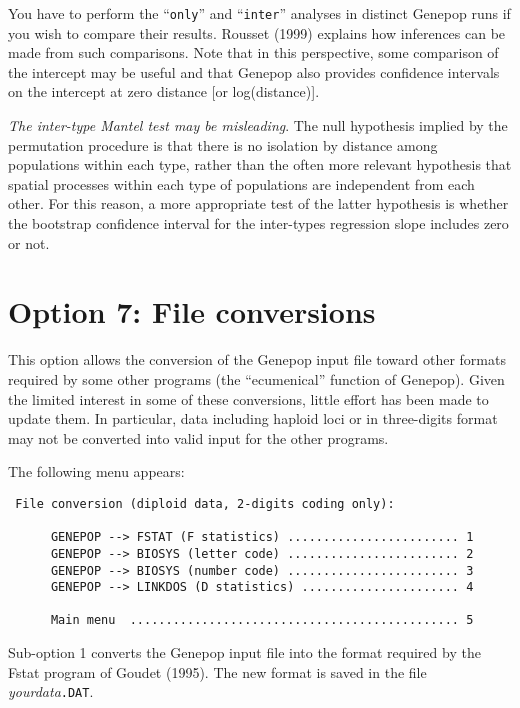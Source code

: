 \documentclass[12pt,]{book}
\theoremstyle{definition}
\theoremstyle{definition}
\theoremstyle{definition}
\theoremstyle{remark}
\begin{document}
You have to perform the ``\texttt{only}'' and ``\texttt{inter}''
analyses in distinct Genepop runs if you wish to compare their results.
Rousset (1999) explains how inferences can be made from such
comparisons. Note that in this perspective, some comparison of the
intercept may be useful and that Genepop also provides confidence
intervals on the intercept at zero distance {[}or log(distance){]}.

\emph{The inter-type Mantel test may be
misleading}. The null hypothesis implied by
the permutation procedure is that there is no isolation by distance
among populations within each type, rather than the often more relevant
hypothesis that spatial processes within each type of populations are
independent from each other. For this reason, a more appropriate test of
the latter hypothesis is whether the bootstrap confidence interval for
the inter-types regression slope includes zero or not.

\section{Option 7: File conversions}\label{option-7-file-conversions}

This option allows the conversion of the Genepop input file toward other
formats required by some other programs (the ``ecumenical'' function of
Genepop). Given the limited interest in some of these conversions,
little effort has been made to update them. In particular, data
including haploid loci or in three-digits format may
not be converted into valid input for the other programs.

The following menu appears:

\begin{verbatim}
 File conversion (diploid data, 2-digits coding only):

      GENEPOP --> FSTAT (F statistics) ........................ 1
      GENEPOP --> BIOSYS (letter code) ........................ 2
      GENEPOP --> BIOSYS (number code) ........................ 3
      GENEPOP --> LINKDOS (D statistics) ...................... 4

      Main menu  .............................................. 5
\end{verbatim}

Sub-option 1 converts the Genepop input file into the format required by
the Fstat program of Goudet (1995). The new format
is saved in the file \emph{yourdata}\texttt{.DAT}.
\end{document}
